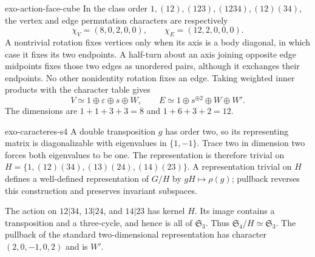 \begin{correction}{exo-action-face-cube}
In the class order $1,(12),(123),(1234),(12)(34)$, the vertex and
edge permutation characters are respectively
\[
 \chi_V=(8,0,2,0,0),\qquad \chi_E=(12,2,0,0,0).
\]
A nontrivial rotation fixes vertices only when its axis is a body
diagonal, in which case it fixes its two endpoints. A half-turn about
an axis joining opposite edge midpoints fixes those two edges as
unordered pairs, although it exchanges their endpoints. No other
nonidentity rotation fixes an edge. Taking weighted inner products
with the character table gives
\[
 V\simeq 1\oplus\varepsilon\oplus s\oplus W,\qquad
 E\simeq 1\oplus s^{\oplus2}\oplus W\oplus W'.
\]
The dimensions are $1+1+3+3=8$ and $1+6+3+2=12$.
\end{correction}

\begin{correction}{exo-caracteres-s4}
A double transposition $g$ has order two, so its representing matrix
is diagonalizable with eigenvalues in $\{1,-1\}$. Trace two in
dimension two forces both eigenvalues to be one. The representation
is therefore trivial on
$H=\{1,(12)(34),(13)(24),(14)(23)\}$.
A representation trivial on $H$ defines a well-defined representation
of $G/H$ by $gH\mapsto\rho(g)$; pullback reverses this construction
and preserves invariant subspaces.

The action on $12|34$, $13|24$, and $14|23$ has kernel $H$.
Its image contains a transposition and a three-cycle, and hence is
all of $\mathfrak S_3$. Thus $\mathfrak S_4/H\simeq\mathfrak S_3$.
The pullback of the standard two-dimensional representation has
character $(2,0,-1,0,2)$ and is $W'$.
\end{correction}

